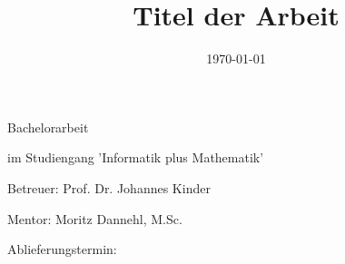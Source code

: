 \documentclass[12pt,letterpaper,ngerman]{article}
\begin{document}
\title{Titel der Arbeit}
\date{\vspace{-5ex}}
{\let\newpage\relax\maketitle}
\thispagestyle{empty}
\begin{center}
\begin{large}
\begin{Large}
Bachelorarbeit
\end{Large}
im Studiengang 'Informatik plus Mathematik' 
\end{large}
\end{center}
\vspace{1cm}
\begin{center}
\begin{large}
Betreuer: Prof. Dr. Johannes Kinder
\end{large}
\end{center}
\begin{center}
\begin{large}
Mentor: Moritz Dannehl, M.Sc.
\end{large}
\end{center}


\begin{center}
\begin{large}
Ablieferungstermin: \date{\today} 
\end{large}
\end{center}
\end{document}
